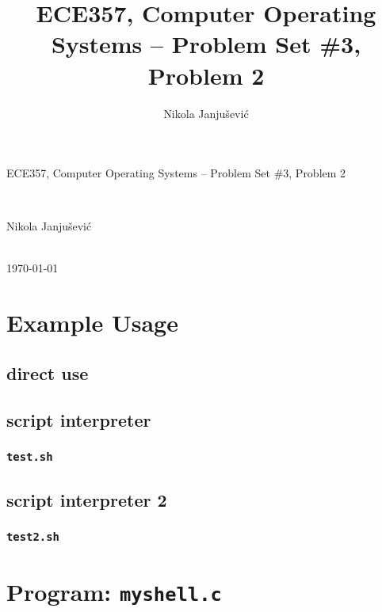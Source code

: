 \documentclass[11pt,a4paper]{article}
\author{Nikola Janju\v{s}evi\'{c}}
\title{ECE357, Computer Operating Systems -- Problem Set \#3, Problem 2}
\begin{document}
\begin{Large}
ECE357, Computer Operating Systems -- Problem Set \#3, Problem 2
\end{Large} \\
\begin{large}
Nikola Janju\v{s}evi\'{c}
\end{large} 
\\
\today

\section{Example Usage}
\subsection{direct use}

\subsection{script interpreter}

\subsubsection{\texttt{test.sh}}

\subsection{script interpreter 2}

\subsubsection{\texttt{test2.sh}}


\pagebreak
\section*{Program: \texttt{myshell.c}}


\end{document}
